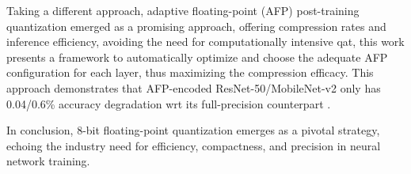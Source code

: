 Taking a different approach, adaptive floating-point (AFP) post-training quantization emerged as a promising approach, offering compression rates and inference efficiency, avoiding the need for computationally intensive \gls{qat}, this work presents a framework to automatically optimize and choose the adequate AFP configuration for each layer, thus maximizing the compression efficacy. This approach demonstrates that AFP-encoded ResNet-50/MobileNet-v2 only has 0.04/0.6\% accuracy degradation wrt its full-precision counterpart \cite{liu2021improving}.

In conclusion, 8-bit floating-point quantization emerges as a pivotal strategy, echoing the industry need for efficiency, compactness, and precision in neural network training.
